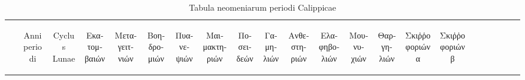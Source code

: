 %
\begingroup
\tiny
\setlength{\tabcolsep}{2.5pt}
\renewcommand{\arraystretch}{0.9}
\setcounter{LTchunksize}{100}
\begin{longtable}[c]{@{}%
 c c c  r@{~}l r@{~}l r@{~}l r@{~}l r@{~}l r@{~}l
r@{~}l r@{~}l r@{~}l r@{~}l r@{~}l r@{~}l r@{~}l  c c c c r@{~}l
@{}}
\caption{Tabula neomeniarum periodi Calippicae}\\
\toprule
~ &
\begin{turn}{90}Anni periodi\end{turn} &
\begin{turn}{90}Cyclus Lunae\end{turn} & 

\multicolumn{2}{c}{\begin{turn}{90}\textgreek{Εκατομβαιών}\end{turn}} &
\multicolumn{2}{c}{\begin{turn}{90}\textgreek{Μεταγειτνιών}\end{turn}} &
\multicolumn{2}{c}{\begin{turn}{90}\textgreek{Βοηδρομιών}\end{turn}} &

\multicolumn{2}{c}{\begin{turn}{90}\textgreek{Πυανεψιών}\end{turn}} &
\multicolumn{2}{c}{\begin{turn}{90}\textgreek{Μαιμακτηριών}\end{turn}} &
\multicolumn{2}{c}{\begin{turn}{90}\textgreek{Ποσειδεών}\end{turn}} &

\multicolumn{2}{c}{\begin{turn}{90}\textgreek{Γαμηλιών}\end{turn}} &
\multicolumn{2}{c}{\begin{turn}{90}\textgreek{Ανθεστηριών}\end{turn}} &
\multicolumn{2}{c}{\begin{turn}{90}\textgreek{Ελαφηβολιών}\end{turn}} &

\multicolumn{2}{c}{\begin{turn}{90}\textgreek{Μουνυχιών}\end{turn}} &
\multicolumn{2}{c}{\begin{turn}{90}\textgreek{Θαργηλιών}\end{turn}} &
\multicolumn{2}{c}{\begin{turn}{90}\textgreek{Σκιῤῥοφοριών α}\end{turn}} &
\multicolumn{2}{c}{\begin{turn}{90}\textgreek{Σκιῤῥοφοριών β}\end{turn}} &


\end{longtable}
